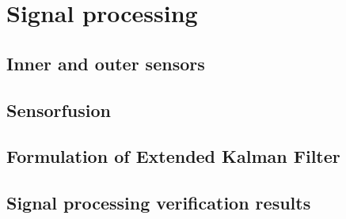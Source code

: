 \section{Signal processing}

\subsection{Inner and outer sensors}

\subsection{Sensorfusion}

\subsection{Formulation of Extended Kalman Filter}

\subsection{Signal processing verification results}